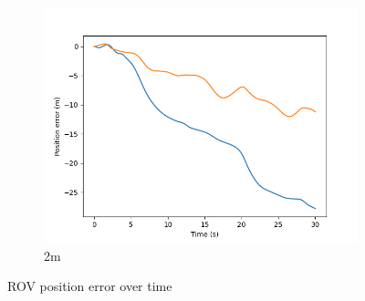 \documentclass[class=article, crop=false]{standalone}
\begin{document}
\begin{figure}
\begin{subfigure}[b]{0.48\textwidth}
        \includegraphics{scenario1/rov-100m/2.0m/rov_position_error_uncontrolled}
        \caption{2m}
        \label{}
    \end{subfigure}

    \caption{ROV position error over time}
\end{figure}
\end{document}
